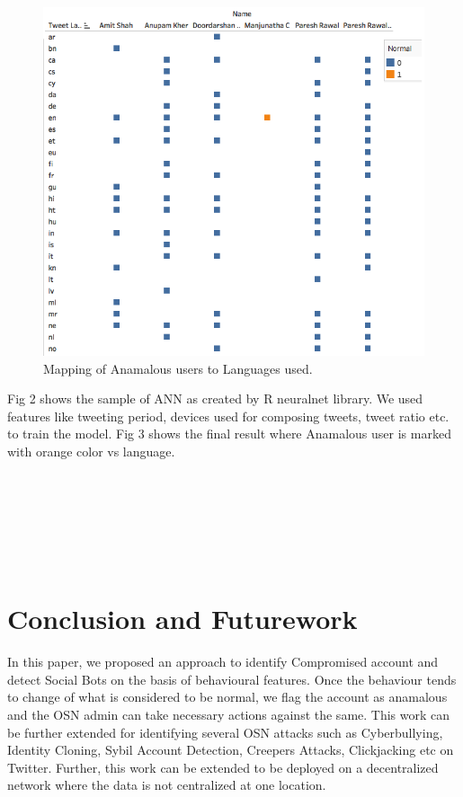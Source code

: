 \documentclass[conference]{IEEEtran}
\begin{document}
\begin{figure}[h!]
  \includegraphics[scale=0.4]{finalResultPic3}
  \caption{Mapping of Anamalous users to Languages used.}
\end{figure}

Fig 2 shows the sample of ANN as created by R neuralnet library. We used features like tweeting period, devices used for composing tweets, tweet ratio etc. to train the model. Fig 3 shows the final result where Anamalous user is marked with orange color vs language.\\\\\\\\\\\\\\


\section{Conclusion and Futurework}

In this paper, we proposed an approach to identify Compromised account and detect Social Bots on the basis of behavioural features. Once the behaviour tends to change of what is considered to be normal, we flag the account as anamalous and the OSN admin can take necessary actions against the same. This work can be further extended for identifying several OSN attacks such as Cyberbullying, Identity Cloning, Sybil Account Detection, Creepers Attacks, Clickjacking etc on Twitter. Further, this work can be extended to be deployed on a decentralized network where the data is not centralized at one location.
\end{document}
